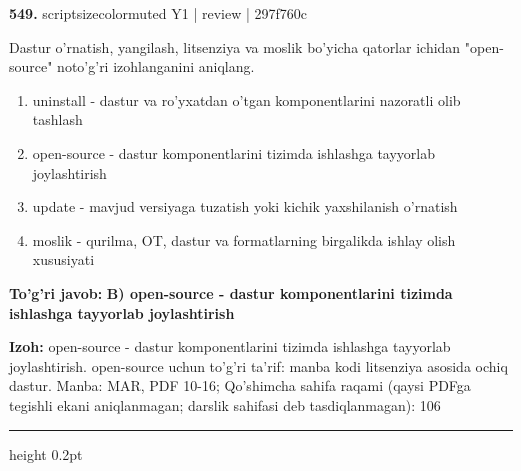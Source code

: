 \documentclass[10pt,a4paper]{article}
\begin{document}
{\bfseries\sffamily\color{ink} 549.} {scriptsizecolor{muted} Y1 | review | 297f760c}
\par
Dastur o'rnatish, yangilash, litsenziya va moslik bo'yicha qatorlar ichidan "open-source" noto'g'ri izohlanganini aniqlang.
\begin{enumerate}[label=\Alph*),leftmargin=9mm]
\item uninstall - dastur va ro'yxatdan o'tgan komponentlarini nazoratli olib tashlash
\item open-source - dastur komponentlarini tizimda ishlashga tayyorlab joylashtirish
\item update - mavjud versiyaga tuzatish yoki kichik yaxshilanish o'rnatish
\item moslik - qurilma, OT, dastur va formatlarning birgalikda ishlay olish xususiyati
\end{enumerate}
\begin{tcolorbox}[enhanced,breakable,colback=teal!4,colframe=teal!60!black,boxrule=0.45pt,arc=1.2mm,left=2.7mm,right=2.7mm,top=1.8mm,bottom=1.8mm,before skip=2mm,after skip=2mm]
{\bfseries\sffamily\color{teal}To'g'ri javob:} \textbf{B) open-source - dastur komponentlarini tizimda ishlashga tayyorlab joylashtirish}
\par\smallskip
{\bfseries Izoh:} open-source - dastur komponentlarini tizimda ishlashga tayyorlab joylashtirish. open-source uchun to'g'ri ta'rif: manba kodi litsenziya asosida ochiq dastur. Manba: MAR, PDF 10-16; Qo'shimcha sahifa raqami (qaysi PDFga tegishli ekani aniqlanmagan; darslik sahifasi deb tasdiqlanmagan): 106
\end{tcolorbox}
\vspace{2mm}\hrule height 0.2pt\vspace{3mm}
\end{document}
